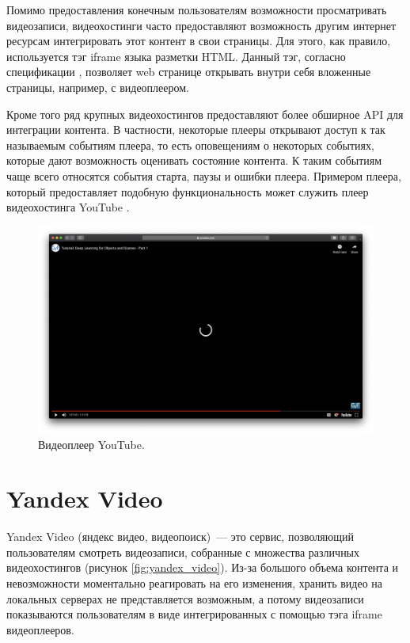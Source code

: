 Помимо предоставления конечным пользователям возможности просматривать видеозаписи, видеохостинги часто предоставляют возможность другим интернет ресурсам интегрировать этот контент в свои страницы. Для этого, как правило, используется тэг iframe языка разметки HTML. Данный тэг, согласно спецификации \cite{HTML53}, позволяет web странице открывать внутри себя вложенные страницы, например, с видеоплеером.

Кроме того ряд крупных видеохостингов предоставляют более обширное API для интеграции контента. В частности, некоторые плееры открывают доступ к так называемым событиям плеера, то есть оповещениям о некоторых событиях, которые дают возможность оценивать состояние контента. К таким событиям чаще всего относятся события старта, паузы и ошибки плеера. Примером плеера, который предоставляет подобную функциональность может служить плеер видеохостинга YouTube \cite{YouTubeAPI}.

\begin{figure}
    \centering
    \includegraphics[width=\textwidth]{../images/youtube_good.png}
    \caption{Видеоплеер YouTube.}
    \label{fig:youtube_good}
\end{figure}

\section{Yandex Video}

Yandex Video \cite{VideoSearch} (яндекс видео, видеопоиск)~--- это сервис, позволяющий пользователям смотреть видеозаписи, собранные с множества различных видеохостингов (рисунок \ref{fig:yandex_video}). Из-за большого объема контента и невозможности моментально реагировать на его изменения, хранить видео на локальных серверах не представляется возможным, а потому видеозаписи показываются пользователям в виде интегрированных с помощью тэга iframe видеоплееров.

